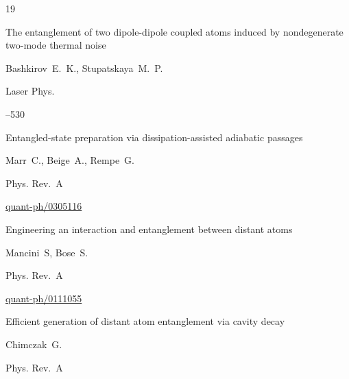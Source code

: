 \begin{thebibliography}{19}

\paper The entanglement of two dipole-dipole coupled atoms induced by nondegenerate two-mode thermal noise

\by  Bashkirov~E.~K.,  Stupatskaya~M.~P.

\jour Laser Phys.




--530





\paper Entangled-state preparation via dissipation-assisted adiabatic passages

\by   Marr~C., Beige~A., Rempe~G.

\jour Phys. Rev.~A





\arxiv \href{http://arxiv.org/abs/quant-ph/0305116}{quant-ph/0305116}





\paper Engineering an interaction and entanglement between distant atoms

\by    Mancini~S, Bose~S.

\jour Phys. Rev.~A





\arxiv \href{http://arxiv.org/abs/quant-ph/0111055}{quant-ph/0111055}





\paper Efficient generation of distant atom entanglement via cavity decay

\by   Chimczak~G.

\jour Phys. Rev.~A




\end{thebibliography}
